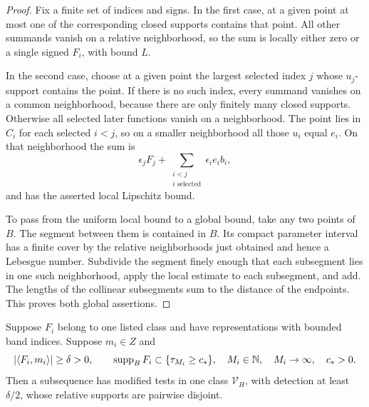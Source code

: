 \begin{proof}
Fix a finite set of indices and signs. In the first case, at a given
point at most one of the corresponding closed supports contains that
point. All other summands vanish on a relative neighborhood, so the
sum is locally either zero or a single signed \(F_i\), with bound
\(L\).

In the second case, choose at a given point the largest selected
index \(j\) whose \(u_j\)-support contains the point. If there is no
such index, every summand vanishes on a common neighborhood, because
there are only finitely many closed supports. Otherwise all selected
later functions vanish on a neighborhood. The point lies in \(C_i\)
for each selected \(i<j\), so on a smaller neighborhood all those
\(u_i\) equal \(e_i\). On that neighborhood the sum is
\[
                \epsilon_jF_j+\sum_{\substack{i<j\\i\text{ selected}}}
                                  \epsilon_i e_i b_i,
\]
and has the asserted local Lipschitz bound.

To pass from the uniform local bound to a global bound, take any two
points of \(B\). The segment between them is contained in \(B\).
Its compact parameter interval has a finite cover by the relative
neighborhoods just obtained and hence a Lebesgue number. Subdivide
the segment finely enough that each subsegment lies in one such
neighborhood, apply the local estimate to each subsegment, and add.
The lengths of the collinear subsegments sum to the distance of the
endpoints. This proves both global assertions.
\end{proof}

\begin{lemma}\label{lem:tail-separation}
Suppose \(F_i\) belong to one listed class and have representations
with bounded band indices. Suppose \(m_i\in Z\) and
\begin{equation}
 |\langle F_i,m_i\rangle|\geq\delta>0,\qquad
\operatorname{supp}_B F_i\subset\{\tau_{M_i}\geq c_*\},
 \quad M_i\in\mathbb N,\quad M_i\to\infty,\quad c_*>0.             \label{eq:tail-hypotheses}
\end{equation}
Then a subsequence has modified tests in one class \(\mathcal V_H\),
with detection at least \(\delta/2\), whose relative supports are
pairwise disjoint.
\end{lemma}

